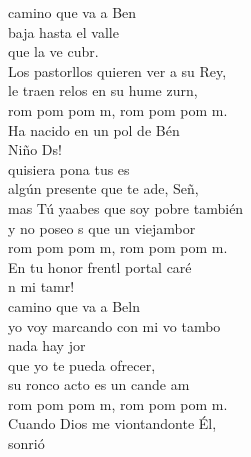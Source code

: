 \begin{cancion}[El tamborilero][]%
	 camino que va a Ben \\
baja hasta el valle \\
	que la ve cubr. \\
	Los pastorllos quieren ver a su Rey,\\
	le traen relos en su hume zurn,\\
	rom pom pom m, rom pom pom m.\\
	Ha nacido en un pol de Bén\\
	 Niño Ds!\\
	 quisiera pona tus es\\
	algún presente que te ade, Señ, \\
	mas Tú yaabes que soy pobre también\\
	y no poseo s que un viejambor\\
	rom pom pom m, rom pom pom m.\\
	En tu honor frentl portal caré\\
	n mi tamr!\\
	 camino que va a Beln\\
	yo voy marcando con mi vo tambo\\
	nada hay jor \\
que yo te pueda ofrecer,\\
	su ronco acto es un cande am\\
	rom pom pom m, rom pom pom m.\\
	Cuando Dios me viontandonte Él,\\
	 sonrió\\
\end{cancion}%
